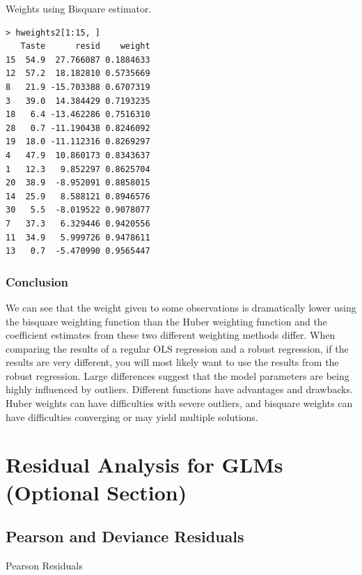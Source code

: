 \documentclass[12pt, a4paper]{article}
\theoremstyle{plain}
\theoremstyle{definition}
\theoremstyle{remark}
\begin{document}


Weights using Bisquare estimator.

\begin{verbatim}
> hweights2[1:15, ]
   Taste      resid    weight
15  54.9  27.766087 0.1884633
12  57.2  18.182810 0.5735669
8   21.9 -15.703388 0.6707319
3   39.0  14.384429 0.7193235
18   6.4 -13.462286 0.7516310
28   0.7 -11.190438 0.8246092
19  18.0 -11.112316 0.8269297
4   47.9  10.860173 0.8343637
1   12.3   9.852297 0.8625704
20  38.9  -8.952091 0.8858015
14  25.9   8.588121 0.8946576
30   5.5  -8.019522 0.9078077
7   37.3   6.329446 0.9420556
11  34.9   5.999726 0.9478611
13   0.7  -5.470990 0.9565447
\end{verbatim}

\subsubsection{Conclusion}
We can see that the weight given to some observations is dramatically lower using the bisquare weighting function than the Huber weighting function and the coefficient estimates from these two different weighting methods differ. 
When comparing the results of a regular OLS regression and a robust regression, if the results are very different, you will most likely want to use the results from the robust regression. 
Large differences suggest that the model parameters are being highly influenced by outliers. Different functions have advantages and drawbacks. Huber weights can have difficulties with severe outliers, and bisquare weights can have difficulties converging or may yield multiple solutions. 




\newpage
\section{Residual Analysis for GLMs (Optional Section)}





\subsection{Pearson and Deviance Residuals} 

Pearson Residuals
\end{document}
